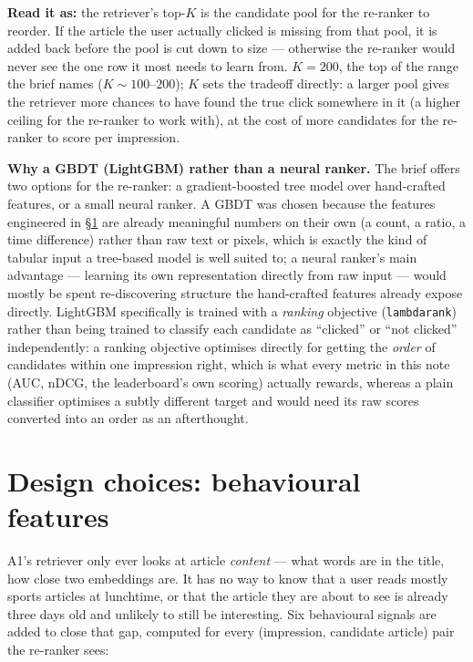 \documentclass[11pt,a4paper]{article}
\begin{document}
\textbf{Read it as:} the retriever's top-$K$ is the candidate pool for the re-ranker to reorder. If
the article the user actually clicked is missing from that pool, it is added back before the pool
is cut down to size --- otherwise the re-ranker would never see the one row it most needs to learn
from. $K=200$, the top of the range the brief names ($K\sim100$--$200$); $K$ sets the tradeoff
directly: a larger pool gives the retriever more chances to have found the true click somewhere in
it (a higher ceiling for the re-ranker to work with), at the cost of more candidates for the
re-ranker to score per impression.

\textbf{Why a GBDT (LightGBM) rather than a neural ranker.} The brief offers two options for the
re-ranker: a gradient-boosted tree model over hand-crafted features, or a small neural ranker.
A GBDT was chosen because the features engineered in \S\ref{sec:q1} are already meaningful numbers
on their own (a count, a ratio, a time difference) rather than raw text or pixels, which is
exactly the kind of tabular input a tree-based model is well suited to; a neural ranker's main
advantage --- learning its own representation directly from raw input --- would mostly be spent
re-discovering structure the hand-crafted features already expose directly. LightGBM specifically
is trained with a \emph{ranking} objective (\texttt{lambdarank}) rather than being trained to
classify each candidate as ``clicked'' or ``not clicked'' independently: a ranking objective
optimises directly for getting the \emph{order} of candidates within one impression right, which
is what every metric in this note (AUC, nDCG, the leaderboard's own scoring) actually rewards,
whereas a plain classifier optimises a subtly different target and would need its raw scores
converted into an order as an afterthought.

\section{Design choices: behavioural features}
\label{sec:q1}

A1's retriever only ever looks at article \emph{content} --- what words are in the title, how
close two embeddings are. It has no way to know that a user reads mostly sports articles at
lunchtime, or that the article they are about to see is already three days old and unlikely to
still be interesting. Six behavioural signals are added to close that gap, computed for every
(impression, candidate article) pair the re-ranker sees:
\end{document}
